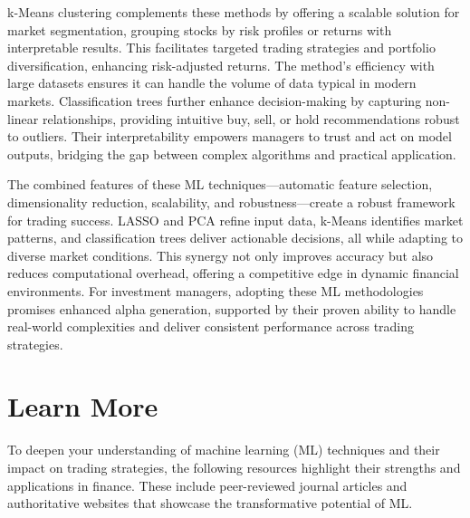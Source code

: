 \documentclass{article}
\begin{document}
k-Means clustering complements these methods by offering a scalable solution for market segmentation, grouping stocks by risk profiles or returns with interpretable results. This facilitates targeted trading strategies and portfolio diversification, enhancing risk-adjusted returns. The method’s efficiency with large datasets ensures it can handle the volume of data typical in modern markets. Classification trees further enhance decision-making by capturing non-linear relationships, providing intuitive buy, sell, or hold recommendations robust to outliers. Their interpretability empowers managers to trust and act on model outputs, bridging the gap between complex algorithms and practical application.

The combined features of these ML techniques—automatic feature selection, dimensionality reduction, scalability, and robustness—create a robust framework for trading success. LASSO and PCA refine input data, k-Means identifies market patterns, and classification trees deliver actionable decisions, all while adapting to diverse market conditions. This synergy not only improves accuracy but also reduces computational overhead, offering a competitive edge in dynamic financial environments. For investment managers, adopting these ML methodologies promises enhanced alpha generation, supported by their proven ability to handle real-world complexities and deliver consistent performance across trading strategies.

\section{Learn More}
\label{sec:learn_more}

To deepen your understanding of machine learning (ML) techniques and their impact on trading strategies, the following resources highlight their strengths and applications in finance. These include peer-reviewed journal articles and authoritative websites that showcase the transformative potential of ML.
\end{document}
